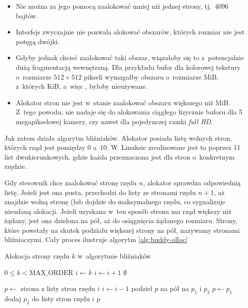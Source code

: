 \begin{itemize}
\item Nie można za jego pomocą zaalokować mniej niż jednej strony,
  tj.\ 4096 bajtów.
\item Interfejs zwyczajnie nie pozwala alokować obszarów, których
  rozmiar nie jest potęgą dwójki.
\item Gdyby jednak chcieć zaalokować taki obszar, wiązałoby się to
  z~potencjalnie dużą fragmentacją wewnętrzną.  Dla przykładu bufor
  dla kolorowej tekstury o~rozmiarze $512 \times 512$ pikseli
  wymagałby obszaru o~rozmiarze \unit[1]{MiB}, z~których
  \unit[256]{KiB}, a~więc , byłoby nieużywane.
\item Alokator stron nie jest w~stanie zaalokować obszaru większego
  niż \unit[4]{MiB}.  Z~tego powodu, nie nadaje się do alokowania
  ciągłego fizycznie buforu dla 5 megapikselowej kamery, czy nawet dla
  pojedynczej ramki {\it full HD}.
\end{itemize}

Jak zatem działa algorytm bliźniaków.  Alokator posiada listę wolnych
stron, których rząd jest pomiędzy $0$ a~$10$.  W~Linuksie zrealizowane
jest to poprzez 11 list dwukierunkowych, gdzie każda przeznaczona jest
dla stron o~konkretnym rzędzie.

Gdy sterownik chce zaalokować stronę rzędu $n$, alokator sprawdza
odpowiednią listę.  Jeżeli jest ona pusta, przechodzi do listy ze
stronami rzędu $n+1$, aż znajdzie wolną stronę (lub dojdzie do
maksymalnego rzędu, co sygnalizuje nieudaną alokacji.  Jeżeli uzyskana
w~ten sposób strona ma rząd większy niż żądany, jest ona dzielona na
pół, aż do osiągnięcia żądanego rozmiaru.  Strony, które powstały na
skutek podziału większej strony na pół, nazywamy stronami
bliźniaczymi.  Cały proces ilustruje algorytm \ref{alg:buddy-alloc}

\begin{algorithm}\label{alg:buddy-alloc}
\caption{Alokacja strony rzędu $k$ w~algorytmie bliźniaków}
\begin{algorithmic}[1]
\Require $0 \leq k < \mathrm{MAX\_ORDER}$
    \State $i \gets k$
        \State $i \gets i + 1$
            \State \Return $\emptyset$
        \EndIf
    \EndWhile

    \State $p \gets$ strona z listy stron rzędu $i$
        \State $i \gets i - 1$
        \State podziel $p$ na pół na $p_1$ i $p_2$
        \State $p \gets p_1$
        \State dodaj $p_2$ do listy stron rzędu $i$
    \EndWhile
    \State \Return $p$
\EndFunction
\end{algorithmic}
\end{algorithm}

